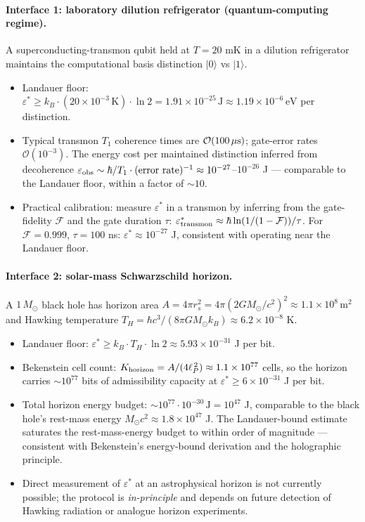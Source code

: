 \documentclass[11pt]{article}
\theoremstyle{plain}
\theoremstyle{definition}
\theoremstyle{remark}
\begin{document}
\paragraph{Interface 1: laboratory dilution refrigerator (quantum-computing regime).}  A superconducting-transmon qubit held at $T = 20$ mK in a dilution refrigerator maintains the computational basis distinction $|0\rangle$ vs $|1\rangle$.
\begin{itemize}[leftmargin=2em,itemsep=2pt]
  \item Landauer floor: $\varepsilon^* \geq k_B \cdot (20 \times 10^{-3}\,\text{K}) \cdot \ln 2 = 1.91 \times 10^{-25}\,\text{J} \approx 1.19 \times 10^{-6}\,\text{eV}$ per distinction.
  \item Typical transmon $T_1$ coherence times are $\mathcal{O}(100\,\mu{\rm s})$; gate-error rates $\mathcal{O}(10^{-3})$.  The energy cost per maintained distinction inferred from decoherence $\varepsilon_{\rm obs} \sim \hbar/T_1 \cdot (\text{error rate})^{-1} \approx 10^{-27}$--$10^{-26}$ J --- comparable to the Landauer floor, within a factor of $\sim 10$.
  \item Practical calibration: measure $\varepsilon^*$ in a transmon by inferring from the gate-fidelity $\mathcal{F}$ and the gate duration $\tau$: $\varepsilon^*_{\rm transmon} \approx \hbar \ln(1/(1-\mathcal{F}))/\tau$.  For $\mathcal{F} = 0.999$, $\tau = 100$ ns: $\varepsilon^* \approx 10^{-27}$ J, consistent with operating near the Landauer floor.
\end{itemize}

\paragraph{Interface 2: solar-mass Schwarzschild horizon.}  A $1\,M_\odot$ black hole has horizon area $A = 4\pi r_s^2 = 4\pi (2 G M_\odot / c^2)^2 \approx 1.1 \times 10^8\,\text{m}^2$ and Hawking temperature $T_H = \hbar c^3/(8\pi G M_\odot k_B) \approx 6.2 \times 10^{-8}$ K.
\begin{itemize}[leftmargin=2em,itemsep=2pt]
  \item Landauer floor: $\varepsilon^* \geq k_B \cdot T_H \cdot \ln 2 \approx 5.93 \times 10^{-31}$ J per bit.
  \item Bekenstein cell count: $K_{\rm horizon} = A/(4\ell_P^{\,2}) \approx 1.1 \times 10^{77}$ cells, so the horizon carries $\sim 10^{77}$ bits of admissibility capacity at $\varepsilon^* \geq 6 \times 10^{-31}$ J per bit.
  \item Total horizon energy budget: $\sim 10^{77} \cdot 10^{-30}\,\text{J} = 10^{47}$ J, comparable to the black hole's rest-mass energy $M_\odot c^2 \approx 1.8 \times 10^{47}$ J.  The Landauer-bound estimate saturates the rest-mass-energy budget to within order of magnitude --- consistent with Bekenstein's energy-bound derivation and the holographic principle.
  \item Direct measurement of $\varepsilon^*$ at an astrophysical horizon is not currently possible; the protocol is \emph{in-principle} and depends on future detection of Hawking radiation or analogue horizon experiments.
\end{itemize}
\end{document}
